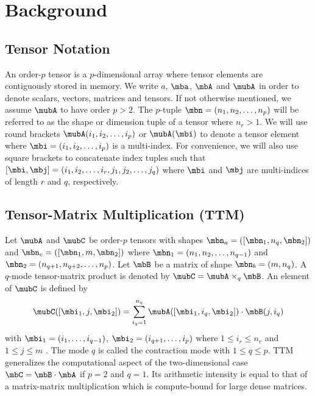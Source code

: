 \section{Background}
\label{sec:preliminaries}

\subsection{Tensor Notation}
\label{sec:preliminaries:notation}
An order-$p$ tensor is a $p$-dimensional array  where tensor elements are contiguously stored in memory\cite{lim:2017:hypermatrices, lee:2018:fundamental}.
We write $a$, $\mba$, $\mbA$ and $\mubA$ in order to denote scalars, vectors, matrices and tensors. 
If not otherwise mentioned, we assume $\mubA$ to have order $p>2$.
The $p$-tuple $\mbn = (n_1,n_2,\dots,n_p)$ will be referred to as the shape or dimension tuple of a tensor where $n_r>1$.
We will use round brackets $\mubA(i_1,i_2,\dots,i_p)$ or $\mubA(\mbi)$ to denote a tensor element where $\mbi = (i_1,i_2,\dots,i_p)$ is a multi-index.
For convenience, we will also use square brackets to concatenate index tuples such that 
$[\mbi,\mbj] = (i_1,i_2,\dots,i_r,\allowbreak j_1,j_2,\dots,j_q)$ where $\mbi$ and $\mbj$ are multi-indices of length $r$ and $q$, respectively.

\subsection{Tensor-Matrix Multiplication (TTM)}
\label{subsec:ttm}
Let $\mubA$ and $\mubC$ be order-$p$ tensors with shapes $\mbn_a = ([\mbn_1,n_q,\mbn_2])$ and $\mbn_c =([\mbn_1,m,\mbn_2])$ where $\mbn_1 = (n_1,n_2,\allowbreak\dots,n_{q-1})$ and $\mbn_2 = (n_{q+1},n_{q+2},\allowbreak\dots,n_p)$.
Let $\mbB$ be a matrix of shape $\mbn_b = (m,n_q)$.
A $q$-mode tensor-matrix product is denoted by $\mubC = \mubA \times_q \mbB$. 
An element of $\mubC$ is defined by
\begin{equation}
	\label{equ:tensor.matrix.multplication}
	\mubC([\mbi_1, j, \mbi_2]) = \sum_{i_q=1}^{n_q} \mubA([\mbi_1, i_q, \mbi_2]) \cdot \mbB(j,i_q)
\end{equation}
with $\mbi_1 = (i_1,\dots,i_{q-1})$, $\mbi_2 = (i_{q+1},\dots,i_p)$ where $1 \leq i_r \leq n_r$ and $1 \leq j \leq m$ \cite{li:2015:input, kolda:2009:decompositions}.
The mode $q$ is called the contraction mode with $1 \leq q \leq p$.
TTM generalizes the computational aspect of the two-dimensional case $\mbC = \mbB \cdot \mbA$ if $p=2$ and $q=1$.
Its arithmetic intensity is equal to that of a matrix-matrix multiplication which is compute-bound for large dense matrices.

